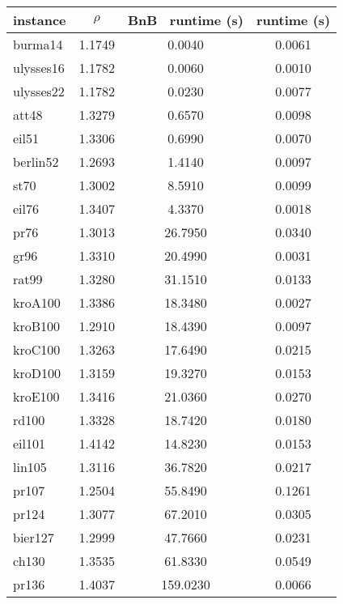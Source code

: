 \begin{tabular}{|lccc|}
    \hline
    instance & $\rho$ & BnB~\cite{DBLP:journals/jgo/SattariI17} runtime (s)  & \binmdt{} runtime (s) \\
    \hline
    burma14 & \num{1.1749} & \num{0.0040} & \num{0.0061} \\
    ulysses16 & \num{1.1782} & \num{0.0060} & \num{0.0010} \\
    ulysses22 & \num{1.1782} & \num{0.0230} & \num{0.0077} \\
    att48 & \num{1.3279} & \num{0.6570} & \num{0.0098} \\
    eil51 & \num{1.3306} & \num{0.6990} & \num{0.0070} \\
    berlin52 & \num{1.2693} & \num{1.4140} & \num{0.0097} \\
    st70 & \num{1.3002} & \num{8.5910} & \num{0.0099} \\
    eil76 & \num{1.3407} & \num{4.3370} & \num{0.0018} \\
    pr76 & \num{1.3013} & \num{26.7950} & \num{0.0340} \\
    gr96 & \num{1.3310} & \num{20.4990} & \num{0.0031} \\
    rat99 & \num{1.3280} & \num{31.1510} & \num{0.0133} \\
    kroA100 & \num{1.3386} & \num{18.3480} & \num{0.0027} \\
    kroB100 & \num{1.2910} & \num{18.4390} & \num{0.0097} \\
    kroC100 & \num{1.3263} & \num{17.6490} & \num{0.0215} \\
    kroD100 & \num{1.3159} & \num{19.3270} & \num{0.0153} \\
    kroE100 & \num{1.3416} & \num{21.0360} & \num{0.0270} \\
    rd100 & \num{1.3328} & \num{18.7420} & \num{0.0180} \\
    eil101 & \num{1.4142} & \num{14.8230} & \num{0.0153} \\
    lin105 & \num{1.3116} & \num{36.7820} & \num{0.0217} \\
    pr107 & \num{1.2504} & \num{55.8490} & \num{0.1261} \\
    pr124 & \num{1.3077} & \num{67.2010} & \num{0.0305} \\
    bier127 & \num{1.2999} & \num{47.7660} & \num{0.0231} \\
    ch130 & \num{1.3535} & \num{61.8330} & \num{0.0549} \\
    pr136 & \num{1.4037} & \num{159.0230} & \num{0.0066} \\

\end{tabular}
